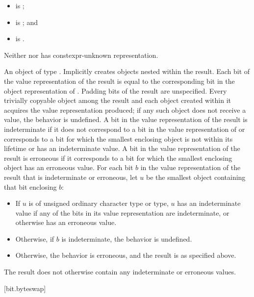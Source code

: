 \begin{itemdescr}
\pnum
\constraints
\begin{itemize}
\item {} is ;
\item {} is ; and
\item {} is .
\end{itemize}

\pnum
\constantwhen
Neither  nor 
has constexpr-unknown representation.

\pnum
\returns
An object of type .
Implicitly creates objects nested within the result.
Each bit of the value representation of the result
is equal to the corresponding bit in the object representation
of . Padding bits of the result are unspecified.
Every trivially copyable object
among the result and each object created within it
acquires the value representation produced;
if any such object does not receive a value,
the behavior is undefined.
A bit in the value representation of the result is indeterminate if
it does not correspond to a bit in the value representation of  or
corresponds to a bit
for which the smallest enclosing object is not within its lifetime or
has an indeterminate value.
A bit in the value representation of the result is erroneous
if it corresponds to a bit
for which the smallest enclosing object has an erroneous value.
For each bit $b$ in the value representation of the result
that is indeterminate or erroneous,
let $u$ be the smallest object containing that bit enclosing $b$:
\begin{itemize}
\item
If $u$ is of unsigned ordinary character type or  type,
$u$ has an indeterminate value
if any of the bits in its value representation are indeterminate, or
otherwise has an erroneous value.
\item
Otherwise, if $b$ is indeterminate, the behavior is undefined.
\item
Otherwise, the behavior is erroneous, and the result is as specified above.
\end{itemize}
The result does not otherwise contain any indeterminate or erroneous values.
\end{itemdescr}

[bit.byteswap]{}

